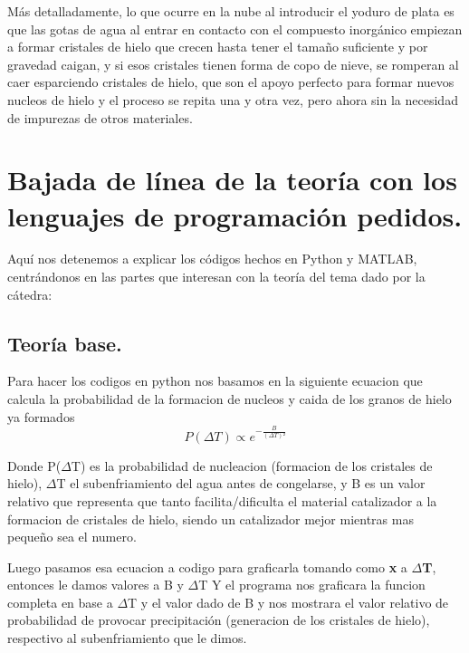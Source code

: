\documentclass[12pt,a4paper]{article}
\begin{document}
Más detalladamente, lo que ocurre en la nube al introducir el yoduro de plata es que las gotas de agua al entrar en contacto con el compuesto inorgánico empiezan a formar cristales de hielo que crecen hasta tener el tamaño suficiente y por gravedad caigan, y si esos cristales tienen forma de copo de nieve, se romperan al caer esparciendo cristales de hielo, que son el apoyo perfecto para formar nuevos nucleos de hielo y el proceso se repita una y otra vez, pero ahora sin la necesidad de impurezas de otros materiales.

\section{Bajada de línea de la teoría con los lenguajes de programación pedidos.}
Aquí nos detenemos a explicar los códigos hechos en Python y MATLAB, centrándonos en las partes que interesan con la teoría del tema dado por la cátedra:
 
\subsection{Teoría base.}
Para hacer los codigos en python nos basamos en la siguiente ecuacion que calcula la probabilidad de la formacion de nucleos y caida de los granos de hielo ya formados
\begin{equation}
    P(\Delta T) \propto  e^{-\frac{B}{(\Delta T)²} }
\end{equation}

Donde P($\Delta$T) es la probabilidad de nucleacion (formacion de los cristales
de hielo), $\Delta$T el subenfriamiento del agua antes de congelarse, y B es un
valor relativo que representa que tanto facilita/dificulta el material
catalizador a la formacion de cristales de hielo, siendo un catalizador mejor
mientras mas pequeño sea el numero.

Luego pasamos esa ecuacion a codigo para graficarla tomando como {\bfseries x} a {\bfseries $\Delta$T}, entonces le damos valores a B y $\Delta$T Y el programa nos graficara la funcion completa en base a $\Delta$T y el valor dado de B y nos mostrara el valor relativo de probabilidad de provocar precipitación (generacion de los cristales de hielo), respectivo al subenfriamiento que le dimos.
\end{document}
